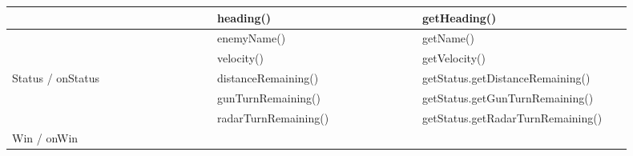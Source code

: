 \begin{center}
\begin{tabular}{ | p{0.3\linewidth} | p{0.3\linewidth} | p{0.3\linewidth} |}
		& heading() & getHeading() \\ \hline
		& enemyName() & getName() \\ \hline
		& velocity() & getVelocity() \\ \hline
		Status / onStatus & distanceRemaining() & getStatus.getDistanceRemaining() \\ \hline
		& gunTurnRemaining() & getStatus.getGunTurnRemaining() \\ \hline
		& radarTurnRemaining() & getStatus.getRadarTurnRemaining() \\ \hline
		Win / onWin &  & \\
		\hline
	\end{tabular}
\end{center}